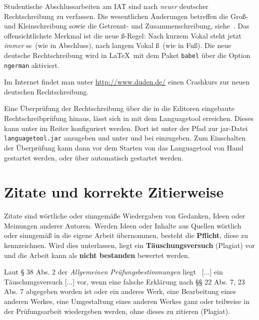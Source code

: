 Studentische Abschlussarbeiten am IAT sind nach \emph{neuer} deutscher Rechtschreibung zu verfassen.
Die wesentlichen Änderungen betreffen die Groß- und Kleinschreibung sowie die Getrennt- und Zusammenschreibung, siehe~\cite{Duden}.
Das offensichtlichste Merkmal ist die neue \glqq ß\grqq-Regel: Nach kurzem Vokal steht jetzt \emph{immer} \glqq ss\grqq\ (wie in Abschluss), nach langem Vokal \glqq ß\grqq\ (wie in Fuß). Die neue deutsche Rechtschreibung wird in \LaTeX\ mit dem Paket \verb|babel| über die Option \verb|ngerman| aktiviert.

Im Internet findet man unter \url{http://www.duden.de/} einen Crashkurs zur neuen deutschen Rechtschreibung.

Eine Überprüfung der Rechtschreibung über die in die Editoren eingebaute Rechtschreibprüfung hinaus, lässt sich in \Texstudio{} mit dem Languagetool erreichen.
Dieses kann unter \Texstudio{} im Reiter  konfiguriert werden.
Dort ist unter  der Pfad zur jar-Datei \texttt{languagetool.jar} anzugeben und unter   und bei   einzugeben.
Zum Einschalten der Überprüfung kann dann vor dem Starten von \Texstudio{} das Languagetool von Hand gestartet werden, oder über  automatisch gestartet werden.


\section{Zitate und korrekte Zitierweise}
\label{sec:Latex-Zitieren}
Zitate sind wörtliche oder sinngemäße Wiedergaben von Gedanken, Ideen oder Meinungen anderer Autoren.
Werden Ideen oder Inhalte aus Quellen wörtlich oder sinngemäß in die eigene Arbeit übernommen, besteht die \textbf{Pflicht}, diese zu kennzeichnen.
Wird dies unterlassen, liegt ein \textbf{Täuschungsversuch} (Plagiat) vor und die Arbeit kann als \textbf{nicht bestanden} bewertet werden.

Laut § 38 Abs. 2 der \emph{Allgemeinen Prüfungsbestimmungen} liegt \glqq\ [...] ein Täuschungsversuch [...] vor, wenn eine falsche Erklärung nach §§ 22 Abs. 7, 23 Abs. 7 abgegeben worden ist oder ein anderes Werk, eine Bearbeitung eines anderen Werkes, eine Umgestaltung eines anderen Werkes ganz oder teilweise in der Prüfungsarbeit wiedergeben werden, ohne dieses zu zitieren (Plagiat).\grqq~\cite{APB}

